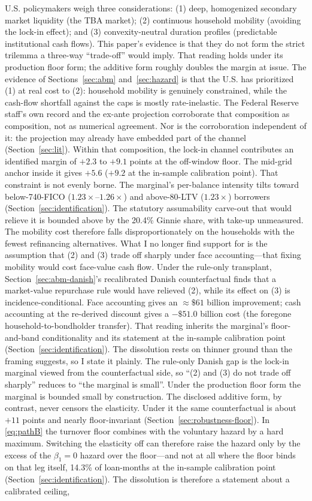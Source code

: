 \documentclass[12pt]{article}
\begin{document}
U.S. policymakers weigh three considerations: (1) deep, homogenized secondary market liquidity (the TBA market); (2) continuous household mobility (avoiding the lock-in effect); and (3) convexity-neutral duration profiles (predictable institutional cash flows). This paper's evidence is that they do not form the strict trilemma a three-way ``trade-off'' would imply. That reading holds under its production floor form; the additive form roughly doubles the margin at issue. The evidence of Sections~\ref{sec:abm} and~\ref{sec:hazard} is that the U.S. has prioritized (1) at real cost to (2): household mobility is genuinely constrained, while the cash-flow shortfall against the caps is mostly rate-inelastic. The Federal Reserve staff's own record and the ex-ante projection corroborate that composition as composition, not as numerical agreement. Nor is the corroboration independent of it: the projection may already have embedded part of the channel (Section~\ref{sec:lit}). Within that composition, the lock-in channel contributes an identified margin of $+2.3$ to $+9.1$ points at the off-window floor. The mid-grid anchor inside it gives $+5.6$ ($+9.2$ at the in-sample calibration point). That constraint is not evenly borne. The marginal's per-balance intensity tilts toward below-740-FICO ($1.23\times$--$1.26\times$) and above-80-LTV ($1.23\times$) borrowers (Section~\ref{sec:identification}). The statutory assumability carve-out that would relieve it is bounded above by the 20.4\% Ginnie share, with take-up unmeasured. The mobility cost therefore falls disproportionately on the households with the fewest refinancing alternatives. What I no longer find support for is the assumption that (2) and (3) trade off sharply under face accounting---that fixing mobility would cost face-value cash flow. Under the rule-only transplant, Section~\ref{sec:abm-danish}'s recalibrated Danish counterfactual finds that a market-value repurchase rule would have relieved (2), while its effect on (3) is incidence-conditional. Face accounting gives an $\approx\$61$ billion improvement; cash accounting at the re-derived discount gives a $-\$51.0$ billion cost (the foregone household-to-bondholder transfer). That reading inherits the marginal's floor-and-band conditionality and its statement at the in-sample calibration point (Section~\ref{sec:identification}). The dissolution rests on thinner ground than the framing suggests, so I state it plainly. The rule-only Danish gap is the lock-in marginal viewed from the counterfactual side, so ``(2) and (3) do not trade off sharply'' reduces to ``the marginal is small''. Under the production floor form the marginal is bounded small by construction. The disclosed additive form, by contrast, never censors the elasticity. Under it the same counterfactual is about $+11$ points and nearly floor-invariant (Section~\ref{sec:robustness-floor}). In \eqref{eq:pathB} the turnover floor combines with the voluntary hazard by a hard maximum. Switching the elasticity off can therefore raise the hazard only by the excess of the $\beta_1 = 0$ hazard over the floor---and not at all where the floor binds on that leg itself, 14.3\% of loan-months at the in-sample calibration point (Section~\ref{sec:identification}). The dissolution is therefore a statement about a calibrated ceiling, 
\end{document}
